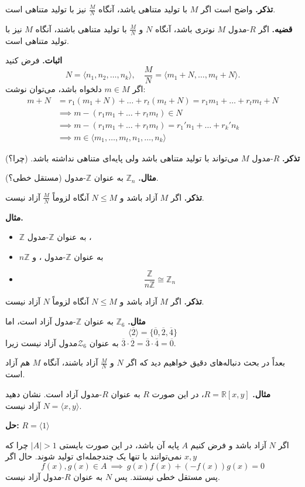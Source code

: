 \textbf{تذکر.} واضح است اگر $M$ با تولید متناهی یاشد، آنگاه $\frac{M}{N}$ نیز با تولید متناهی است.

\textbf{قضیه.} اگر $R$-مدول $M$ نوتری باشد، آنگاه $N$ و $\frac{M}{N}$ با تولید متناهی باشند، آنگاه $M$ نیز با تولید متناهی است.

\textbf{اثبات.} فرض کنید
\[
    N = \langle n_1, n_2, \dots, n_k \rangle, \quad
    \frac{M}{N} = \langle m_1 + N, \dots, m_t + N \rangle.
\]
اگر $m \in M$ دلخواه باشد، می‌توان نوشت:
\[
    \begin{aligned}
        m + N & = r_1 (m_1 + N) + \dots + r_t (m_t + N) = r_1 m_1 + \dots + r_t m_t + N \\
              & \implies m - (r_1 m_1 + \dots + r_t m_t) \in N                          \\
              & \implies m - (r_1 m_1 + \dots + r_t m_t) = r_1' n_1 + \dots + r_k' n_k  \\
              & \implies m \in \langle m_1, \dots, m_t, n_1, \dots, n_k \rangle
    \end{aligned}
\]



\hrulefill

\textbf{تذکر.} $R$-مدول $M$ می‌تواند با تولید متناهی باشد ولی   پایه‌ای متناهی نداشته باشد. (چرا؟)

\textbf{مثال.} $\mathbb{Z}_n$ به عنوان $\mathbb{Z}$-مدول (مستقل خطی؟).

\hrulefill

\textbf{تذکر.} اگر $M$ آزاد باشد و $N \leqslant M$ آنگاه لزوماً $\frac{M}{N}$ آزاد نیست.

\textbf{مثال.}
\begin{itemize}
    \item $\mathbb{Z}$ به عنوان $\mathbb{Z}$-مدول ،
    \item $n\mathbb{Z}$ به عنوان $\mathbb{Z}$-مدول ، و
    \item
          \[
              \frac{\mathbb{Z}}{n\mathbb{Z}} \cong \mathbb{Z}_n
          \]
\end{itemize}


\hrulefill

\textbf{تذکر.} اگر $M$ آزاد باشد و $N \leqslant M$ آنگاه لزوماً $N$ آزاد نیست.

\textbf{مثال.} $\mathbb{Z}_6$ به عنوان $\mathbb{Z}$-مدول آزاد است، اما
\[
    \langle \overline{2} \rangle = \{ \overline{0}, \overline{2} , \overline{4} \}
\]
به عنوان \(\mathcal{Z}_6\)مدول آزاد نیست زیرا $\overline{3} \cdot \overline{2} =\overline{3} \cdot \overline{4} = \overline{0}$.

بعداً در بحث دنباله‌های دقیق
خواهیم دید
که اگر
$N$ و $\frac{M}{N}$ آزاد باشند، آنگاه $M$ هم آزاد است.

\textbf{مثال.} $R = \mathbb{R}[x,y]$، در این صورت $R$ به عنوان $R$-مدول آزاد است. نشان دهید $N = \langle x, y \rangle$ آزاد نیست.

\textbf{حل:} $R = \langle 1 \rangle$

اگر $N$ آزاد باشد و فرض کنیم $A$ پایه آن باشد،
در این صورت
بایستی
$|A| > 1$
چرا که
$x, y$
نمی‌توانند
با تنها یک چندجمله‌ای تولید شوند.
حال اگر
\[
    f(x), g(x) \in A \ \implies \ g(x) f(x) + (-f(x)) g(x) = 0
\]
پس مستقل خطی نیستند. پس $N$ به عنوان $R$-مدول آزاد نیست.
